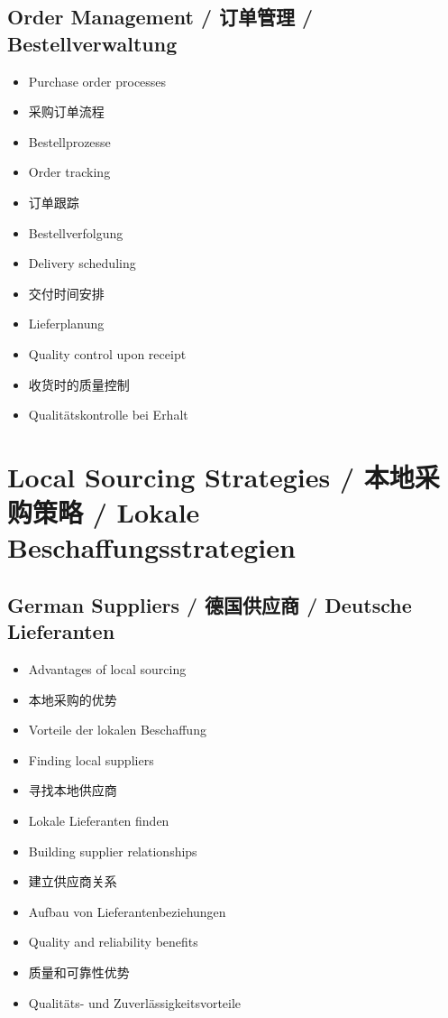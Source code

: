\subsection{Order Management / 订单管理 / Bestellverwaltung}
\begin{itemize}
    \item Purchase order processes
    \item 采购订单流程
    \item Bestellprozesse
    \item Order tracking
    \item 订单跟踪
    \item Bestellverfolgung
    \item Delivery scheduling
    \item 交付时间安排
    \item Lieferplanung
    \item Quality control upon receipt
    \item 收货时的质量控制
    \item Qualitätskontrolle bei Erhalt
\end{itemize}

\section{Local Sourcing Strategies / 本地采购策略 / Lokale Beschaffungsstrategien}

\subsection{German Suppliers / 德国供应商 / Deutsche Lieferanten}
\begin{itemize}
    \item Advantages of local sourcing
    \item 本地采购的优势
    \item Vorteile der lokalen Beschaffung
    \item Finding local suppliers
    \item 寻找本地供应商
    \item Lokale Lieferanten finden
    \item Building supplier relationships
    \item 建立供应商关系
    \item Aufbau von Lieferantenbeziehungen
    \item Quality and reliability benefits
    \item 质量和可靠性优势
    \item Qualitäts- und Zuverlässigkeitsvorteile
\end{itemize}


